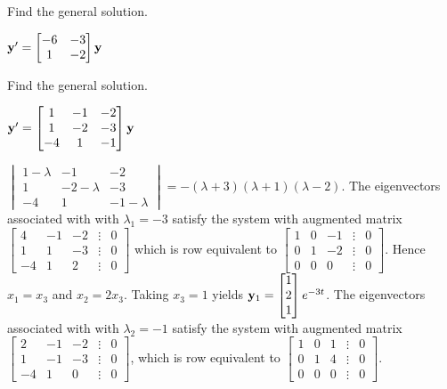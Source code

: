 \documentclass{ximera}
\begin{document}
\begin{problem}\label{exer:10.4.7}
Find the general solution.

$ {\bf y}'=
\begin{bmatrix}-6&-3\\1&-2\end{bmatrix}{\bf y}$
\end{problem}

\begin{problem}\label{exer:10.4.8}
Find the general solution.

$ {\bf y}'=
\begin{bmatrix}
1&-1&-2\\1&-2&-3\\-4&1&-1\end{bmatrix}
{\bf y}$

\begin{solution}
    $  \begin{vmatrix}1-\lambda&-1&-2\\1&-2-\lambda&-3 \\
-4&1&-1-\lambda\end{vmatrix}=-(\lambda+3)(\lambda+1)(\lambda-2)$.
The eigenvectors associated with
 with $\lambda_1=-3$ satisfy the system with  augmented matrix
$  \begin{bmatrix}4&-1&-2&\vdots&0\\1&1
&-3&\vdots&0\\-4&1&2&\vdots&0
 \end{bmatrix}$
which is row equivalent to
$  \begin{bmatrix}1&0&-1&\vdots&0\\0&1&-2&
\vdots&0\\0&0&0&\vdots&0 \end{bmatrix}$.
Hence $x_1=x_3$ and $x_2=2x_3$.  Taking $x_3=1$ yields
${\bf y}_1=  \begin{bmatrix} 1\\2\\1
 \end{bmatrix}e^{-3t}$.
The eigenvectors associated with
 with $\lambda_2=-1$ satisfy the system with  augmented matrix
$  \begin{bmatrix}2&-1&-2&\vdots&0\\1&-1
&-3&\vdots&0\\-4&1&0&\vdots&0
 \end{bmatrix}$,
which is row equivalent to
$  \begin{bmatrix}1&0&1&\vdots&0\\0&1&4&
\vdots&0\\0&0&0&\vdots&0 \end{bmatrix}$.

\end{solution}
\end{problem}
\end{document}
